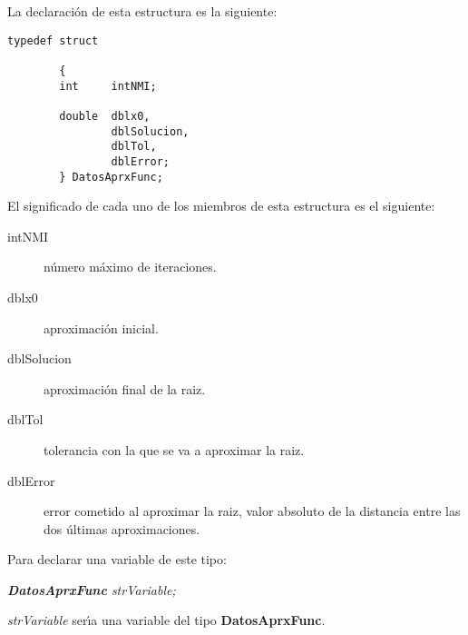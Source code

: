 La declaraci\'on de esta estructura es la siguiente:

\begin{verbatim}
typedef struct

        {
        int     intNMI;

        double  dblx0,
                dblSolucion,
                dblTol,
                dblError; 
        } DatosAprxFunc;
\end{verbatim}

El significado de cada uno de los miembros de esta estructura es el siguiente:

\begin{description}
\item[intNMI] n\'umero m\'aximo de iteraciones.
\item[dblx0] aproximaci\'on inicial.
\item[dblSolucion] aproximaci\'on final de la raiz.
\item[dblTol] tolerancia con la que se va a aproximar la raiz.
\item[dblError] error cometido al aproximar la raiz, valor absoluto de la 
distancia entre las dos \'ultimas aproximaciones.
\end{description}

Para declarar una variable de este tipo:

\begin{center}
\emph{\textbf{DatosAprxFunc} strVariable;}
\end{center}

\emph{strVariable} ser\'{\i}a una variable del tipo \textbf{DatosAprxFunc}.

